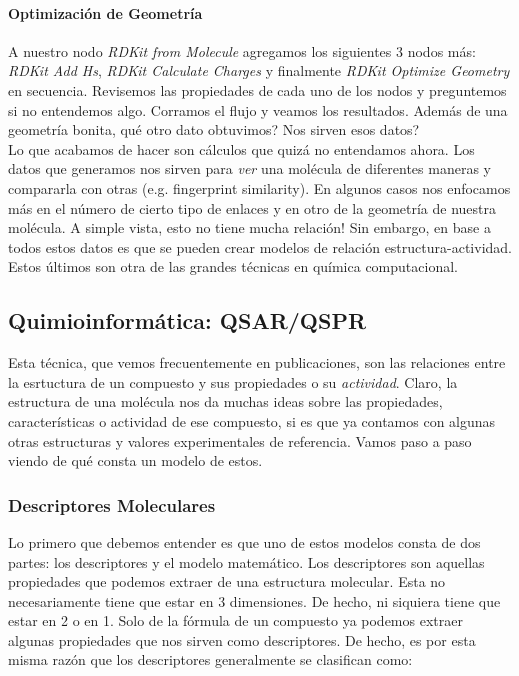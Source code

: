 \documentclass[10pt,letterpaper]{article}
\begin{document}
\paragraph{Optimizaci\'on de Geometr\'ia}
A nuestro nodo \textit{RDKit from Molecule} agregamos los siguientes 3 nodos m\'as: \textit{RDKit Add Hs}, \textit{RDKit Calculate Charges} y finalmente \textit{RDKit Optimize Geometry} en secuencia. Revisemos las propiedades de cada uno de los nodos y preguntemos si no entendemos algo. Corramos el flujo y veamos los resultados. Adem\'as de una geometr\'ia bonita, qu\'e otro dato obtuvimos? Nos sirven esos datos?\\

Lo que acabamos de hacer son c\'alculos que quiz\'a no entendamos ahora. Los datos que generamos nos sirven para \emph{ver} una mol\'ecula de diferentes maneras y compararla con otras (e.g. fingerprint similarity). En algunos casos nos enfocamos m\'as en el n\'umero de cierto tipo de enlaces y en otro de la geometr\'ia de nuestra mol\'ecula. A simple vista, esto no tiene mucha relaci\'on! Sin embargo, en base a todos estos datos es que se pueden crear modelos de relaci\'on estructura-actividad. Estos \'ultimos son otra de las grandes t\'ecnicas en qu\'imica computacional.

\subsection{Quimioinform\'atica: QSAR/QSPR}
Esta t\'ecnica, que vemos frecuentemente en publicaciones, son las relaciones entre la esrtuctura de un compuesto y sus propiedades o su \emph{actividad}. Claro, la estructura de una mol\'ecula nos da muchas ideas sobre las propiedades, caracter\'isticas o actividad de ese compuesto, si es que ya contamos con algunas otras estructuras y valores experimentales de referencia. Vamos paso a paso viendo de qu\'e consta un modelo de estos.\\

\subsubsection{Descriptores Moleculares}
Lo primero que debemos entender es que uno de estos modelos consta de dos partes: los descriptores y el modelo matem\'atico. Los descriptores son aquellas propiedades que podemos extraer de una estructura molecular. Esta no necesariamente tiene que estar en 3 dimensiones. De hecho, ni siquiera tiene que estar en 2 o en 1. Solo de la f\'ormula de un compuesto ya podemos extraer algunas propiedades que nos sirven como descriptores. De hecho, es por esta misma raz\'on que los descriptores generalmente se clasifican como:
\end{document}

